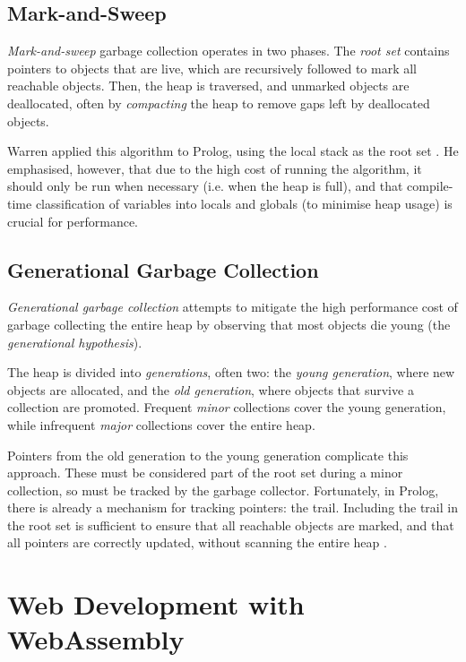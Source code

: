 \subsection{Mark-and-Sweep}

\label{sec:prep-mark-and-sweep}

\emph{Mark-and-sweep} garbage collection operates in two phases. The \emph{root set} contains pointers to objects that are live, which are recursively followed to mark all reachable objects. Then, the heap is traversed, and unmarked objects are deallocated, often by \emph{compacting} the heap to remove gaps left by deallocated objects.

Warren applied this algorithm to Prolog, using the local stack as the root set \cite{warrenImplementingPrologCompiling1977}. He emphasised, however, that due to the high cost of running the algorithm, it should only be run when necessary (i.e. when the heap is full), and that compile-time classification of variables into locals and globals (to minimise heap usage) is crucial for performance.

\subsection{Generational Garbage Collection}

\label{sec:generational-gc}

\emph{Generational garbage collection} attempts to mitigate the high performance cost of garbage collecting the entire heap by observing that most objects die young (the \emph{generational hypothesis}).

The heap is divided into \emph{generations}, often two: the \emph{young generation}, where new objects are allocated, and the \emph{old generation}, where objects that survive a collection are promoted. Frequent \emph{minor} collections cover the young generation, while infrequent \emph{major} collections cover the entire heap.

Pointers from the old generation to the young generation complicate this approach. These must be considered part of the root set during a minor collection, so must be tracked by the garbage collector. Fortunately, in Prolog, there is already a mechanism for tracking pointers: the trail. Including the trail in the root set is sufficient to ensure that all reachable objects are marked, and that all pointers are correctly updated, without scanning the entire heap \cite{bekkersDynamicMemoryManagement1992}.

\section{Web Development with WebAssembly}

